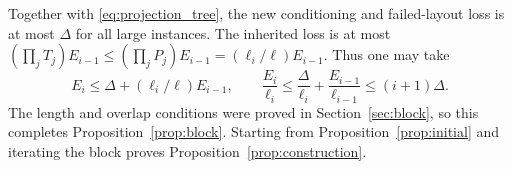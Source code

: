Together with \eqref{eq:projection_tree}, the new conditioning and failed-layout loss is at most $\Delta$ for all large instances.  The inherited loss is at most $(\prod_jT_j)E_{i-1}\le(\prod_jP_j)E_{i-1}=(\ell_i/\ell)E_{i-1}$.  Thus one may take
\[
 E_i\le\Delta+(\ell_i/\ell)E_{i-1},\qquad
 \frac{E_i}{\ell_i}\le\frac{\Delta}{\ell_i}
       +\frac{E_{i-1}}{\ell_{i-1}}\le(i+1)\Delta.
\]
The length and overlap conditions were proved in Section~\ref{sec:block}, so this completes Proposition~\ref{prop:block}.  Starting from Proposition~\ref{prop:initial} and iterating the block proves Proposition~\ref{prop:construction}.
